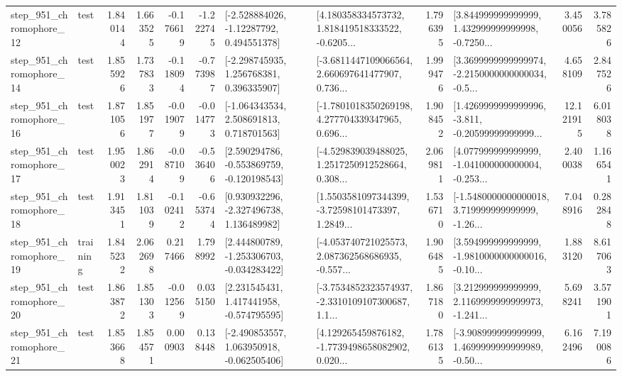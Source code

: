 \begin{tabular}{llrrrrllrlrr}
  step\_951\_chromophore\_12 &      test &      1.840144 &    1.663525 &     -0.176619 & -1.222745 &    [-2.528884026, -1.12287792, 0.494551378] &  [4.180358334573732, 1.818419518333522, -0.6205... &       1.796395 &  [3.844999999999999, 1.432999999999998, -0.7250... &            3.450056 &          3.785826 \\
  step\_951\_chromophore\_14 &      test &      1.855926 &    1.737833 &     -0.118094 & -0.773987 &    [-2.298745935, 1.256768381, 0.396335907] &  [-3.6811447109066564, 2.660697641477907, 0.736... &       1.999476 &  [3.3699999999999974, -2.2150000000000034, -0.5... &            4.658109 &          2.847526 \\
  step\_951\_chromophore\_16 &      test &      1.871056 &    1.851977 &     -0.019079 & -0.014773 &    [-1.064343534, 2.508691813, 0.718701563] &  [-1.7801018350269198, 4.277704339347965, 0.696... &       1.908452 &  [1.4269999999999996, -3.811, -0.20599999999999... &           12.121915 &          6.018038 \\
  step\_951\_chromophore\_17 &      test &      1.950023 &    1.862914 &     -0.087109 & -0.536406 &   [2.590294786, -0.553869759, -0.120198543] &  [-4.529839039488025, 1.2517250912528664, 0.308... &       2.069811 &  [4.077999999999999, -1.041000000000004, -0.253... &            2.400038 &          1.166541 \\
  step\_951\_chromophore\_18 &      test &      1.913451 &    1.811039 &     -0.102412 & -0.653744 &    [0.930932296, -2.327496738, 1.136489982] &  [1.5503581097344399, -3.72598101473397, 1.2849... &       1.536710 &  [-1.5480000000000018, 3.719999999999999, -1.26... &            7.048916 &          0.282848 \\
  step\_951\_chromophore\_19 &  training &      1.845232 &    2.062698 &      0.217466 &  1.798992 &   [2.444800789, -1.253306703, -0.034283422] &  [-4.053740721025573, 2.087362568686935, -0.557... &       1.906485 &  [3.594999999999999, -1.9810000000000016, -0.10... &            1.883120 &          8.617063 \\
  step\_951\_chromophore\_20 &      test &      1.863872 &    1.851303 &     -0.012569 &  0.035150 &    [2.231545431, 1.417441958, -0.574795595] &  [-3.7534852323574937, -2.3310109107300687, 1.1... &       1.867180 &  [3.212999999999999, 2.1169999999999973, -1.241... &            5.698241 &          3.571901 \\
  step\_951\_chromophore\_21 &      test &      1.853668 &    1.854571 &      0.000903 &  0.138448 &   [-2.490853557, 1.063950918, -0.062505406] &  [4.129265459876182, -1.7739498658082902, 0.020... &       1.786135 &  [-3.908999999999999, 1.4699999999999989, -0.50... &            6.162496 &          7.190086 \\

\end{tabular}
